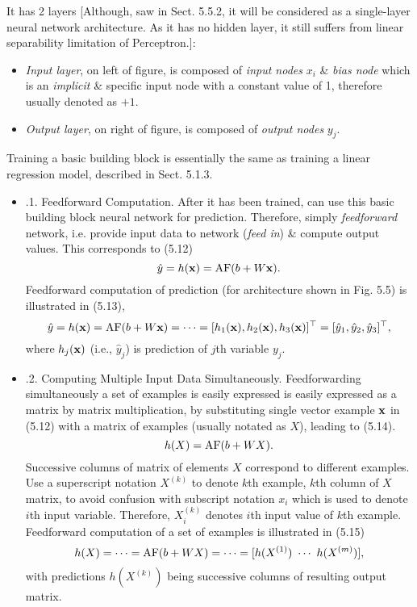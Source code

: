 \documentclass{article}
\begin{document}
\begin{itemize}
\begin{itemize}
		It has 2 layers [Although, saw in Sect. 5.5.2, it will be considered as a single-layer neural network architecture. As it has no hidden layer, it still suffers from linear separability limitation of Perceptron.]:
		\begin{itemize}
			\item {\it Input layer}, on left of figure, is composed of {\it input nodes} $x_i$ \& {\it bias node} which is an {\it implicit} \& specific input node with a constant value of 1, therefore usually denoted as $+1$.
			\item {\it Output layer}, on right of figure, is composed of {\it output nodes} $y_j$.
		\end{itemize}
		Training a basic building block is essentially the same as training a linear regression model, described in Sect. 5.1.3.
		\begin{itemize}
			\item {.1. Feedforward Computation.} After it has been trained, can use this basic building block neural network for prediction. Therefore, simply {\it feedforward} network, i.e. provide input data to network ({\it feed in}) \& compute output values. This corresponds to (5.12)
			\begin{equation*}
				\hat{y} = h({\bf x}) = {\rm AF}(b + W{\bf x}).
			\end{equation*}
			Feedforward computation of prediction (for architecture shown in {\sf Fig. 5.5}) is illustrated in (5.13),
			\begin{equation*}
				\hat{y} = h({\bf x}) = {\rm AF}(b + W{\bf x}) = \cdots = [h_1({\bf x}),h_2({\bf x}),h_3({\bf x})]^\top = [\hat{y}_1,\hat{y}_2,\hat{y}_3]^\top,
			\end{equation*}
			where $h_j({\bf x})$ (i.e., $\hat{y}_j$) is prediction of $j$th variable $y_j$.
			\item {.2. Computing Multiple Input Data Simultaneously.} Feedforwarding simultaneously a set of examples is easily expressed is easily expressed as a matrix by matrix multiplication, by substituting single vector example ${\bf x}$ in (5.12) with a matrix of examples (usually notated as $X$), leading to (5.14).
			\begin{equation*}
				h(X) = {\rm AF}(b +  WX).
			\end{equation*}
			Successive columns of matrix of elements $X$ correspond to different examples. Use a superscript notation $X^{(k)}$ to denote $k$th example, $k$th column of $X$ matrix, to avoid confusion with subscript notation $x_i$ which is used to denote $i$th input variable. Therefore, $X_i^{(k)}$ denotes $i$th input value of $k$th example. Feedforward computation of a set of examples is illustrated in (5.15)
			\begin{equation*}
				h(X) = \cdots = {\rm AF}(b + WX) = \cdots = [h(X^{(1)})\ \cdots\ h(X^{(m)})],
			\end{equation*}
			with predictions $h(X^(k))$ being successive columns of resulting output matrix.
			

\end{itemize}
\end{itemize}
\end{itemize}
\end{document}
